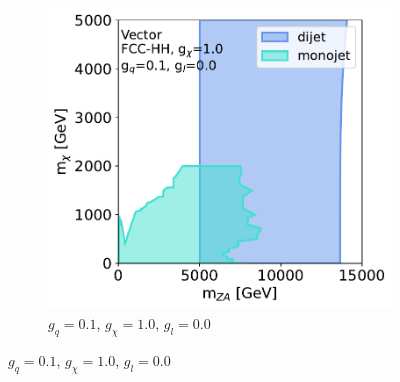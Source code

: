 \documentclass[11pt]{article}
\begin{document}
\begin{figure}
\begin{subfigure}[b]{0.49\textwidth}
         \includegraphics[width=\textwidth]{SummaryPlots-EF10/figures/massmass/fcc-hh/massmass_vector_gq0.1_gdm1.0_gl0.0.pdf}
         \caption{$g_q=0.1$, $g_{\chi}=1.0$, $g_l=0.0$}
         \label{subfig:vector-fcc-v2}
     \end{subfigure}


\end{figure}
\end{document}

